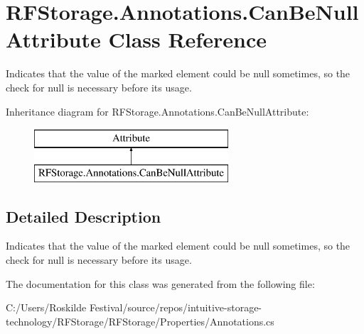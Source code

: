 \section{R\+F\+Storage.\+Annotations.\+Can\+Be\+Null\+Attribute Class Reference}
\label{class_r_f_storage_1_1_annotations_1_1_can_be_null_attribute}


Indicates that the value of the marked element could be {\ttfamily null} sometimes, so the check for {\ttfamily null} is necessary before its usage.  


Inheritance diagram for R\+F\+Storage.\+Annotations.\+Can\+Be\+Null\+Attribute\+:\begin{figure}[H]
\begin{center}
\leavevmode
\includegraphics[height=2.000000cm]{class_r_f_storage_1_1_annotations_1_1_can_be_null_attribute}
\end{center}
\end{figure}


\subsection{Detailed Description}
Indicates that the value of the marked element could be {\ttfamily null} sometimes, so the check for {\ttfamily null} is necessary before its usage. 


\begin{DoxyCode}{0}
\DoxyCodeLine{}
\DoxyCodeLine{\}}
\end{DoxyCode}


The documentation for this class was generated from the following file\+:\begin{DoxyCompactItemize}
\item 
C\+:/\+Users/\+Roskilde Festival/source/repos/intuitive-\/storage-\/technology/\+R\+F\+Storage/\+R\+F\+Storage/\+Properties/Annotations.\+cs\end{DoxyCompactItemize}
